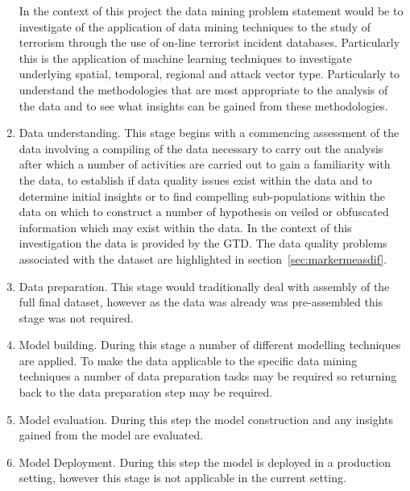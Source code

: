 \begin{enumerate}
In the context of this project the data  mining problem statement would be to investigate of the application of data mining techniques to the study of terrorism through the use of on-line terrorist incident  databases. Particularly this is the application of machine learning techniques to investigate underlying spatial, temporal, regional and attack vector type. Particularly to understand the methodologies that are most appropriate to the analysis of the data and to see what insights can be gained from these methodologies. 
\item Data understanding. This stage begins with a commencing assessment of the data involving a compiling of the data necessary to carry out the analysis after which a number of activities are carried out to gain a familiarity with the data, to establish if data quality issues exist within the data and to determine initial insights or to find compelling sub-populations within the data on which to construct a number of hypothesis on veiled or obfuscated information which may exist within the data. In the context of this investigation the data is provided by the GTD. The data quality problems associated  with the dataset are highlighted in section~\ref{sec:markermeasdif}.
\item Data preparation. This stage would traditionally deal with assembly of the full final dataset, however as the data was already was pre-assembled this stage was not required.  
\item Model building. During this stage a number of different modelling techniques are applied. To make the data applicable to the specific data mining techniques a number of data preparation tasks may be required so returning back to the data preparation step may be required.
\item Model evaluation. During this step the model construction and any insights gained from the model are evaluated.
\item Model Deployment. During this step the model is deployed in a production setting, however this stage is not applicable in the current setting. 
\end{enumerate}

